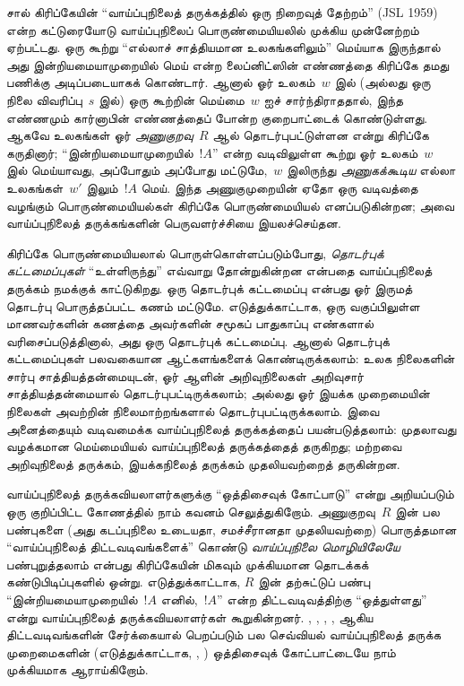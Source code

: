\documentclass[../../../include/open-logic-section]{subfiles}
\begin{document}
சால் கிரிப்கேயின் “வாய்ப்புநிலைத் தருக்கத்தில் ஒரு நிறைவுத் தேற்றம்”
(JSL 1959) என்ற கட்டுரையோடு வாய்ப்புநிலைப் பொருண்மையியலில் முக்கிய
முன்னேற்றம் ஏற்பட்டது. ஒரு கூற்று “எல்லாச் சாத்தியமான உலகங்களிலும்”
மெய்யாக இருந்தால் அது இன்றியமையாமுறையில் மெய் என்ற லைப்னிட்ஸின் எண்ணத்தை
கிரிப்கே தமது பணிக்கு அடிப்படையாகக் கொண்டார். ஆனால் ஓர் உலகம்~$w$ இல்
(அல்லது ஒரு நிலை விவரிப்பு~$s$ இல்) ஒரு கூற்றின் மெய்மை~$w$ ஐச்
சார்ந்திராததால், இந்த எண்ணமும் கார்னாபின் எண்ணத்தைப் போன்ற குறைபாட்டைக்
கொண்டுள்ளது. ஆகவே உலகங்கள் ஓர் \emph{அணுகுறவு}~$R$ ஆல் தொடர்புபட்டுள்ளன
என்று கிரிப்கே கருதினார்; “இன்றியமையாமுறையில்~$!A$” என்ற வடிவிலுள்ள
கூற்று ஓர் உலகம்~$w$ இல் மெய்யாவது, அப்போதும் அப்போது மட்டுமே,~$w$
இலிருந்து \emph{அணுகக்கூடிய} எல்லா உலகங்கள்~$w'$ இலும்~$!A$ மெய்.
இந்த அணுகுமுறையின் ஏதோ ஒரு வடிவத்தை வழங்கும் பொருண்மையியல்கள் கிரிப்கே
பொருண்மையியல் எனப்படுகின்றன; அவை வாய்ப்புநிலைத் தருக்கங்களின் பெருவளர்ச்சியை
இயலச்செய்தன.

கிரிப்கே பொருண்மையியலால் பொருள்கொள்ளப்படும்போது, \emph{தொடர்புக்
கட்டமைப்புகள்} “உள்ளிருந்து” எவ்வாறு தோன்றுகின்றன என்பதை வாய்ப்புநிலைத்
தருக்கம் நமக்குக் காட்டுகிறது. ஒரு தொடர்புக் கட்டமைப்பு என்பது ஓர் இருமத்
தொடர்பு பொருத்தப்பட்ட கணம் மட்டுமே. எடுத்துக்காட்டாக, ஒரு வகுப்பிலுள்ள
மாணவர்களின் கணத்தை அவர்களின் சமூகப் பாதுகாப்பு எண்களால் வரிசைப்படுத்தினால்,
அது ஒரு தொடர்புக் கட்டமைப்பு. ஆனால் தொடர்புக் கட்டமைப்புகள் பலவகையான
ஆட்களங்களைக் கொண்டிருக்கலாம்: உலக நிலைகளின் சார்பு சாத்தியத்தன்மையுடன்,
ஓர் ஆளின் அறிவுநிலைகள் அறிவுசார் சாத்தியத்தன்மையால் தொடர்புபட்டிருக்கலாம்;
அல்லது ஓர் இயக்க முறைமையின் நிலைகள் அவற்றின் நிலைமாற்றங்களால்
தொடர்புபட்டிருக்கலாம். இவை அனைத்தையும் வடிவமைக்க வாய்ப்புநிலைத் தருக்கத்தைப்
பயன்படுத்தலாம்: முதலாவது வழக்கமான மெய்மையியல் வாய்ப்புநிலைத் தருக்கத்தைத்
தருகிறது; மற்றவை அறிவுநிலைத் தருக்கம், இயக்கநிலைத் தருக்கம் முதலியவற்றைத்
தருகின்றன.

வாய்ப்புநிலைத் தருக்கவியலாளர்களுக்கு “ஒத்திசைவுக் கோட்பாடு” என்று
அறியப்படும் ஒரு குறிப்பிட்ட கோணத்தில் நாம் கவனம் செலுத்துகிறோம்.
அணுகுறவு~$R$ இன் பல பண்புகளை (அது கடப்புநிலை உடையதா, சமச்சீரானதா
முதலியவற்றை) பொருத்தமான “வாய்ப்புநிலைத் திட்டவடிவங்களைக்” கொண்டு
\emph{வாய்ப்புநிலை மொழியிலேயே} பண்புறுத்தலாம் என்பது கிரிப்கேயின் மிகவும்
முக்கியமான தொடக்கக் கண்டுபிடிப்புகளில் ஒன்று. எடுத்துக்காட்டாக, $R$ இன்
தற்சுட்டுப் பண்பு “இன்றியமையாமுறையில்~$!A$ எனில்,~$!A$” என்ற
திட்டவடிவத்திற்கு “ஒத்துள்ளது” என்று வாய்ப்புநிலைத் தருக்கவியலாளர்கள்
கூறுகின்றனர். , , , ,  ஆகிய
திட்டவடிவங்களின் சேர்க்கையால் பெறப்படும் பல செவ்வியல் வாய்ப்புநிலைத் தருக்க
முறைமைகளின் (எடுத்துக்காட்டாக, , ) ஒத்திசைவுக்
கோட்பாட்டையே நாம் முக்கியமாக ஆராய்கிறோம்.
\end{document}
